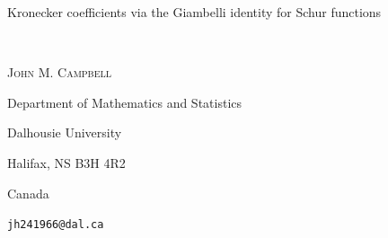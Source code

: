 \documentclass[12pt]{article}
\begin{document}
\begin{center}
 {\Large Kronecker coefficients via the Giambelli identity for Schur functions}

 \ 

 {\textsc{John M. Campbell}} 

 \vspace{0.1in}

 {\footnotesize Department of Mathematics and Statistics}

 {\footnotesize Dalhousie University}

 {\footnotesize Halifax, NS B3H 4R2}

 {\footnotesize Canada}

 \vspace{0.1in}

 {\footnotesize {\tt jh241966@dal.ca}}

 \vspace{0.1in}

\end{center}

\begin{abstract}
 One of the central open problems in both algebraic combinatorics and representation theory is to find a positive combinatorial rule for 
 Kronecker coefficients $ g_{\lambda \, \mu \, \nu}$. A notable advance in this direction is due to Blasiak, who proved a combinatorial 
 interpretation in terms of colored Yamanouchi tableaux for the case whereby one of the indexing partitions is hook-shaped. In this paper, 
 we introduce a framework for the evaluation and combinatorial interpretation of Kronecker coefficients, combining a Schur function 
 identity of Littlewood, the Giambelli identity for Schur functions, and Blasiak's combinatorial rule. This framework reduces the study of 
 Kronecker coefficients to alternating sums involving hook-indexed cases. As an application of this framework, we obtain combinatorial 
 interpretations of $g_{t, h^{(1)}, h^{(2)}}$ for two-row partitions $t$ and hook-like partitions $h^{(1)}$ and $h^{(2)}$ satisfying natural 
 conditions. More broadly, our approach provides a systematic method for extending hook-based combinatorial rules to wider families 
 of Kronecker coefficients.
\end{abstract}


\vspace{0.1in}

\end{document}
